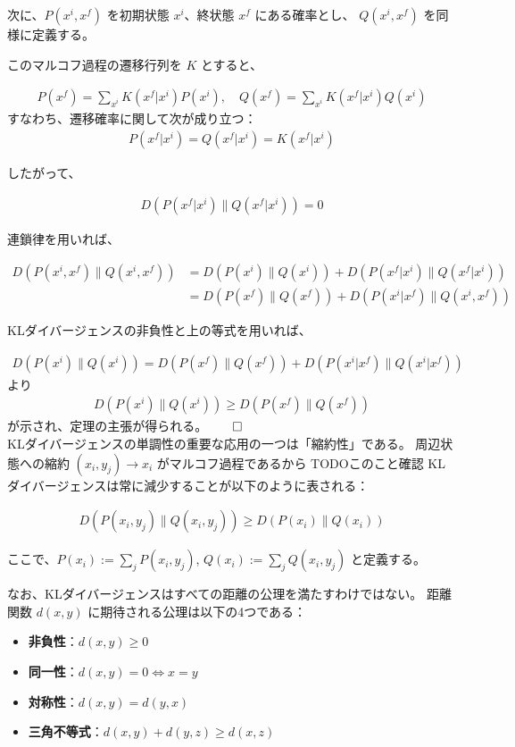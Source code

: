 \documentclass[a4paper,11pt]{jsarticle}
\numberwithin{equation}{section}
\begin{document}
次に、$P(x^i, x^f)$ を初期状態 $x^i$、終状態 $x^f$ にある確率とし、
$Q(x^i, x^f)$ を同様に定義する。

このマルコフ過程の遷移行列を $K$ とすると、

\begin{align}
P(x^f) = \sum_{x^i} K(x^f | x^i) P(x^i), \quad
Q(x^f) = \sum_{x^i} K(x^f | x^i) Q(x^i)
\end{align}
すなわち、遷移確率に関して次が成り立つ：
\begin{align}
P(x^f | x^i) = Q(x^f | x^i) = K(x^f | x^i)
\end{align}

したがって、

\begin{align}
D(P(x^f | x^i) \| Q(x^f | x^i)) = 0
\end{align}

連鎖律を用いれば、

\begin{align}
D(P(x^i, x^f) \| Q(x^i, x^f))
&= D(P(x^i) \| Q(x^i)) + D(P(x^f | x^i) \| Q(x^f | x^i)) \\
&= D(P(x^f) \| Q(x^f)) + D(P(x^i| x^f) \| Q(x^i, x^f))
\end{align}

KLダイバージェンスの非負性と上の等式を用いれば、

\begin{align}
    D(P(x^i) \| Q(x^i)) = D(P(x^f) \| Q(x^f)) + D(P(x^i | x^f) \| Q(x^i | x^f))
\end{align}
より
\begin{align}
D(P(x^i) \| Q(x^i)) \geq D(P(x^f) \| Q(x^f))
\end{align}
が示され、定理の主張が得られる。$\qed$\\

KLダイバージェンスの単調性の重要な応用の一つは「縮約性」である。
周辺状態への縮約 $(x_i, y_j) \to x_i$ がマルコフ過程であるから
TODOこのこと確認
KLダイバージェンスは常に減少することが以下のように表される：

\begin{align}
D(P(x_i, y_j) \| Q(x_i, y_j)) \geq D(P(x_i) \| Q(x_i))
\end{align}

ここで、$P(x_i) := \sum_j P(x_i, y_j)$, $Q(x_i) := \sum_j Q(x_i, y_j)$ と定義する。

なお、KLダイバージェンスはすべての距離の公理を満たすわけではない。
距離関数 $d(x, y)$ に期待される公理は以下の4つである：

\begin{itemize}
  \item \textbf{非負性}：$d(x, y) \geq 0$
  \item \textbf{同一性}：$d(x, y) = 0 \iff x = y$
  \item \textbf{対称性}：$d(x, y) = d(y, x)$
  \item \textbf{三角不等式}：$d(x, y) + d(y, z) \geq d(x, z)$
\end{itemize}
\end{document}
